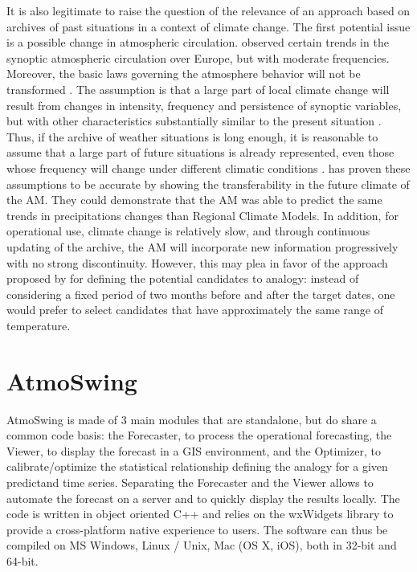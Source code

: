 \documentclass[review]{elsarticle}
\begin{document}
It is also legitimate to raise the question of the relevance of an approach based on archives of past situations in a context of climate change. The first potential issue is a possible change in atmospheric circulation. \citet{Philipp2007} observed certain trends in the synoptic atmospheric circulation over Europe, but with moderate frequencies. Moreover, the basic laws governing the atmosphere behavior will not be transformed \citep{Hewitson1996}. The assumption is that a large part of local climate change will result from changes in intensity, frequency and persistence of synoptic variables, but with other characteristics substantially similar to the present situation \citep{Hewitson1996}. Thus, if the archive of weather situations is long enough, it is reasonable to assume that a large part of future situations is already represented, even those whose frequency will change under different climatic conditions \citep{Wetterhall2005}. \citet{Dayon2015} has proven these assumptions to be accurate by showing the transferability in the future climate of the AM. They could demonstrate that the AM was able to predict the same trends in precipitations changes than Regional Climate Models. In addition, for operational use, climate change is relatively slow, and through continuous updating of the archive, the AM will incorporate new information progressively with no strong discontinuity. However, this may plea in favor of the approach proposed by \cite{BenDaoud2010} for defining the potential candidates to analogy: instead of considering a fixed period of two months before and after the target dates, one would prefer to select candidates that have approximately the same range of temperature.


\section{AtmoSwing}
\label{sec:atmoswing}

AtmoSwing is made of 3 main modules that are standalone, but do share a common code basis: the Forecaster, to process the operational forecasting, the Viewer, to display the forecast in a GIS environment, and the Optimizer, to calibrate/optimize the statistical relationship defining the analogy for a given predictand time series. Separating the Forecaster and the Viewer allows to automate the forecast on a server and to quickly display the results locally. The code is written in object oriented C++ and relies on the wxWidgets \citep{Smart2006} library to provide a cross-platform native experience to users. The software can thus be compiled on MS Windows, Linux / Unix, Mac (OS X, iOS), both in 32-bit and 64-bit.
\end{document}
